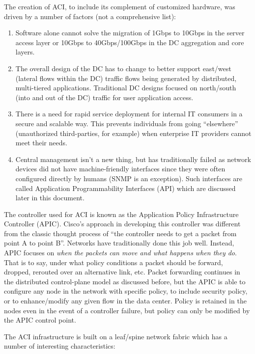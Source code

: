 The creation of ACI, to include its complement of customized hardware, was
driven by a number of factors (not a comprehensive list):

\begin{enumerate}
  \item Software alone cannot solve the migration of 1Gbps to 10Gbps in the
  server access layer or 10Gbps to 40Gbps/100Gbps in the DC aggregation and
  core layers.
  \item The overall design of the DC has to change to better support east/west
  (lateral flows within the DC) traffic flows being generated by distributed,
  multi-tiered applications. Traditional DC designs focused on north/south
  (into and out of the DC) traffic for user application access.
  \item There is a need for rapid service deployment for internal IT consumers
  in a secure and scalable way. This prevents individuals from going
  ``elsewhere'' (unauthorized third-parties, for example) when enterprise IT
  providers cannot meet their needs.
  \item Central management isn’t a new thing, but has traditionally failed as
  network devices did not have machine-friendly interfaces since they were
  often configured directly by humans (SNMP is an exception). Such interfaces
  are called Application Programmability Interfaces (API) which are discussed
  later in this document.
\end{enumerate}

The controller used for ACI is known as the Application Policy Infrastructure
Controller (APIC). Cisco’s approach in developing this controller was
different from the classic thought process of ``the controller needs to get a
packet from point A to point B''. Networks have traditionally done this job
well. Instead, APIC focuses on \textit{when the packets can move and what
happens when they do}. That is to say, under what policy conditions a
packet should be forward, dropped, rerouted over an alternative link, etc.
Packet forwarding continues in the distributed control-plane model as
discussed before, but the APIC is able to configure any node in the network
with specific policy, to include security policy, or to enhance/modify any
given flow in the data center. Policy is retained in the nodes even in the
event of a controller failure, but policy can only be modified by the APIC
control point.

The ACI infrastructure is built on a leaf/spine network fabric which has a
number of interesting characteristics:

